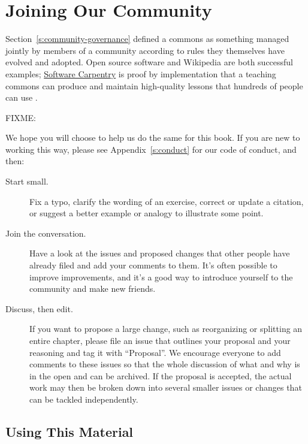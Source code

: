 \chapter{Joining Our Community}\label{s:joining}

Section~\ref{s:community-governance} defined a commons as
something managed jointly by members of a community
according to rules they themselves have evolved and adopted.
Open source software and Wikipedia are both successful examples;
\href{http://software-carpentry.org}{Software Carpentry} is proof by implementation that
a teaching commons can produce and maintain high-quality lessons
that hundreds of people can use \cite{Wils2016}.

FIXME: \cite{Deve2018}

We hope you will choose to help us do the same for this book.
If you are new to working this way,
please see Appendix~\ref{s:conduct} for our code of conduct,
and then:

\begin{description}

\item[Start small.]
  Fix a typo,
  clarify the wording of an exercise,
  correct or update a citation,
  or suggest a better example or analogy to illustrate some point.

\item[Join the conversation.]
  Have a look at the issues and proposed changes that other people have already filed
  and add your comments to them.
  It's often possible to improve improvements,
  and it's a good way to introduce yourself to the community and make new friends.

\item[Discuss, then edit.]
  If you want to propose a large change,
  such as reorganizing or splitting an entire chapter,
  please file an issue that outlines your proposal and your reasoning and tag it with ``Proposal''.
  We encourage everyone to add comments to these issues
  so that the whole discussion of what and why is in the open and can be archived.
  If the proposal is accepted,
  the actual work may then be broken down into several smaller issues or changes
  that can be tackled independently.

\end{description}

\section{Using This Material}\label{s:joining-using}

